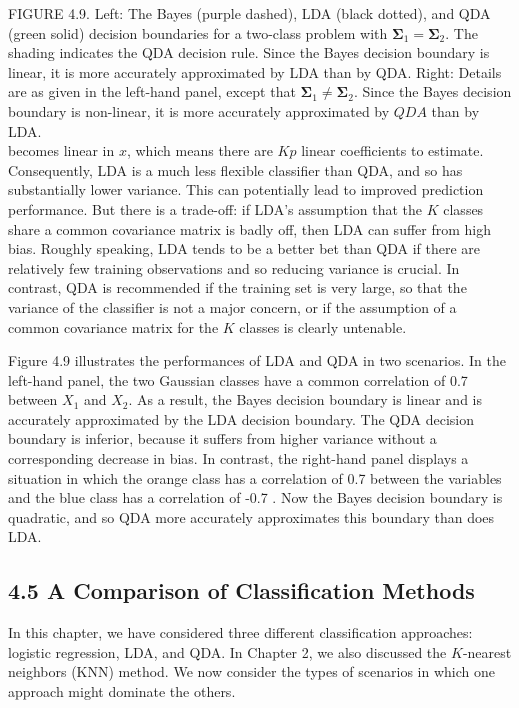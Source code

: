 \documentclass[10pt]{article}
\begin{document}
FIGURE 4.9. Left: The Bayes (purple dashed), LDA (black dotted), and QDA (green solid) decision boundaries for a two-class problem with $\boldsymbol{\Sigma}_{1}=\boldsymbol{\Sigma}_{2}$. The shading indicates the QDA decision rule. Since the Bayes decision boundary is linear, it is more accurately approximated by LDA than by QDA. Right: Details are as given in the left-hand panel, except that $\boldsymbol{\Sigma}_{1} \neq \boldsymbol{\Sigma}_{2}$. Since the Bayes decision boundary is non-linear, it is more accurately approximated by $Q D A$ than by LDA.\\
becomes linear in $x$, which means there are $K p$ linear coefficients to estimate. Consequently, LDA is a much less flexible classifier than QDA, and so has substantially lower variance. This can potentially lead to improved prediction performance. But there is a trade-off: if LDA's assumption that the $K$ classes share a common covariance matrix is badly off, then LDA can suffer from high bias. Roughly speaking, LDA tends to be a better bet than QDA if there are relatively few training observations and so reducing variance is crucial. In contrast, QDA is recommended if the training set is very large, so that the variance of the classifier is not a major concern, or if the assumption of a common covariance matrix for the $K$ classes is clearly untenable.

Figure 4.9 illustrates the performances of LDA and QDA in two scenarios. In the left-hand panel, the two Gaussian classes have a common correlation of 0.7 between $X_{1}$ and $X_{2}$. As a result, the Bayes decision boundary is linear and is accurately approximated by the LDA decision boundary. The QDA decision boundary is inferior, because it suffers from higher variance without a corresponding decrease in bias. In contrast, the right-hand panel displays a situation in which the orange class has a correlation of 0.7 between the variables and the blue class has a correlation of -0.7 . Now the Bayes decision boundary is quadratic, and so QDA more accurately approximates this boundary than does LDA.

\subsection*{4.5 A Comparison of Classification Methods}
In this chapter, we have considered three different classification approaches: logistic regression, LDA, and QDA. In Chapter 2, we also discussed the $K$-nearest neighbors (KNN) method. We now consider the types of scenarios in which one approach might dominate the others.
\end{document}
